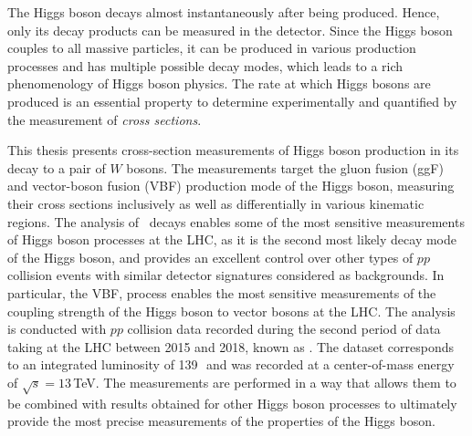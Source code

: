 The Higgs boson decays almost instantaneously after being produced. Hence, only its decay products can be measured in the detector. 
Since the Higgs boson couples to all massive particles, it can be produced in various production processes and has multiple possible decay modes, which leads to a rich phenomenology of Higgs boson physics. 
The rate at which Higgs bosons are produced is an essential property to determine experimentally and quantified by the measurement of \emph{cross sections}. 

This thesis presents cross-section measurements of Higgs boson production in its decay to a pair of $W$ bosons.
The measurements target the gluon fusion (ggF) and vector-boson fusion (VBF) production mode of the Higgs boson, measuring their cross sections inclusively as well as differentially in various kinematic regions.
The analysis of \HWW\ decays enables some of the most sensitive measurements of Higgs boson processes at the LHC, as it is the second most likely decay mode of the Higgs boson, and provides an excellent control over other types of $pp$ collision events with similar detector signatures considered as backgrounds. 
In particular, the VBF, \HWW process enables the most sensitive measurements of the coupling strength of the Higgs boson to vector bosons at the LHC. 
The analysis is conducted with $pp$ collision data recorded during the second period of data taking at the LHC between 2015 and 2018, known as \RunTwo. The dataset corresponds to an integrated luminosity of 139\,\ifb\ and was recorded at a center-of-mass energy of $\sqrt{s} = 13\,$TeV.
The measurements are performed in a way that allows them to be combined with results obtained for other Higgs boson processes to ultimately provide the most precise measurements of the properties of the Higgs boson.

